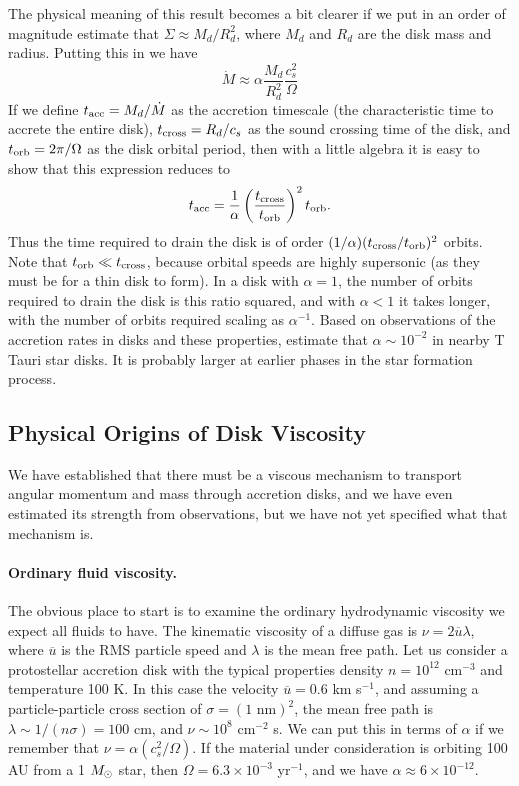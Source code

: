 The physical meaning of this result becomes a bit clearer if we put in an order of magnitude estimate that $\Sigma \approx M_d / R_d^2$, where $M_d$ and $R_d$ are the disk mass and radius. Putting this in we have
\begin{equation}
\dot{M} \approx \alpha \frac{M_d}{R_d^2} \frac{c_s^2}{\Omega}
\end{equation}
If we define $t_{\rm acc} = M_d/\dot{M}$ as the accretion timescale (the characteristic time to accrete the entire disk), $t_{\rm cross} = R_d/c_s$ as the sound crossing time of the disk, and $t_{\rm orb} = 2\pi/\Omega$ as the disk orbital period, then with a little algebra it is easy to show that this expression reduces to
\begin{equation}
t_{\rm acc} = \frac{1}{\alpha} \left(\frac{t_{\rm cross}}{t_{\rm orb}}\right)^2 t_{\rm orb}.
\end{equation}
Thus the time required to drain the disk is of order $(1/\alpha)(t_{\rm cross}/t_{\rm orb})^2$ orbits. Note that $t_{\rm orb} \ll t_{\rm cross}$, because orbital speeds are highly supersonic (as they must be for a thin disk to form). In a disk with $\alpha = 1$, the number of orbits required to drain the disk is this ratio squared, and with $\alpha < 1$ it takes longer, with the number of orbits required scaling as $\alpha^{-1}$. Based on observations of the accretion rates in disks and these properties, \citet{hartmann98a} estimate that $\alpha \sim 10^{-2}$ in nearby T Tauri star disks. It is probably larger at earlier phases in the star formation process.

\subsection{Physical Origins of Disk Viscosity}

We have established that there must be a viscous mechanism to transport angular momentum and mass through accretion disks, and we have even estimated its strength from observations, but we have not yet specified what that mechanism is.

\paragraph{Ordinary fluid viscosity.}

The obvious place to start is to examine the ordinary hydrodynamic viscosity we expect all fluids to have. The kinematic viscosity of a diffuse gas is $\nu = 2\overline{u}\lambda$, where $\overline{u}$ is the RMS particle speed and $\lambda$ is the mean free path. Let us consider a protostellar accretion disk with the typical properties density $n=10^{12}$ cm$^{-3}$ and temperature 100 K. In this case the velocity $\overline{u} = 0.6$ km s$^{-1}$, and assuming a particle-particle cross section of $\sigma=(1\mbox{ nm})^2$, the mean free path is $\lambda \sim 1/(n\sigma)=100$ cm, and $\nu \sim 10^8$ cm$^{-2}$ s. We can put this in terms of $\alpha$ if we remember that $\nu = \alpha (c_s^2/\Omega)$. If the material under consideration is orbiting 100 AU from a 1 $M_{\odot}$ star, then $\Omega = 6.3\times 10^{-3}$ yr$^{-1}$, and we have $\alpha \approx 6\times 10^{-12}$.


